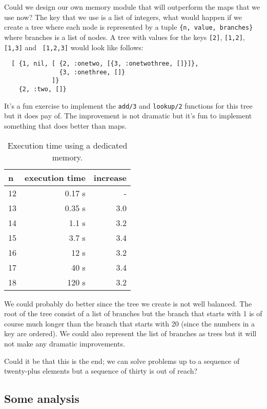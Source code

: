 \documentclass[a4paper,11pt]{article}
\begin{document}
Could we design our own memory module that will outperform the maps
that we use now? The key that we use is a list of integers, what would
happen if we create a tree where each node is represented by a tuple
{\tt \{n, value, branches\}} where branches is a list of nodes. A tree
with values for the keys {\tt [2]}, {\tt [1,2]}, {\tt [1,3]} and {\tt
[1,2,3]} would look like follows:

\begin{verbatim}
  [ {1, nil, [ {2, :onetwo, [{3, :onetwothree, []}]},
               {3, :onethree, []}
             ]}
    {2, :two, []}
\end{verbatim}

It's a fun exercise to implement the {\tt add/3} and {\tt lookup/2}
functions for this tree but it does pay of. The improvement is not
dramatic but it's fun to implement something that does better than
maps.

\begin{table}[h!]
  \begin{center}
    \begin{tabular}{l|r|r}
      \textbf{n} & \textbf{execution time} & \textbf{increase}\\
      \hline
      12	 &0.17 s & -\\ 
      13	 &0.35 s &3.0 \\ 
      14	 &1.1 s &3.2 \\ 
      15	 &3.7 s &3.4 \\ 
      16	 &12 s &3.2 \\ 
      17	 &40 s &3.4 \\ 
      18	 &120 s&3.2 \\ 
    \end{tabular}
    \caption{Execution time using a dedicated memory.}
  \end{center}
\end{table}

We could probably do better since the tree we create is not well
balanced. The root of the tree consist of a list of branches but the
branch that starts with 1 is of course much longer than the branch
that starts with 20 (since the numbers in a key are ordered). We could
also represent the list of branches as trees  but it will not
make any dramatic improvements.

Could it be that this is the end; we can solve problems up to a
sequence of twenty-plus elements but a sequence of thirty is out of
reach? 

\subsection*{Some analysis}
\end{document}
